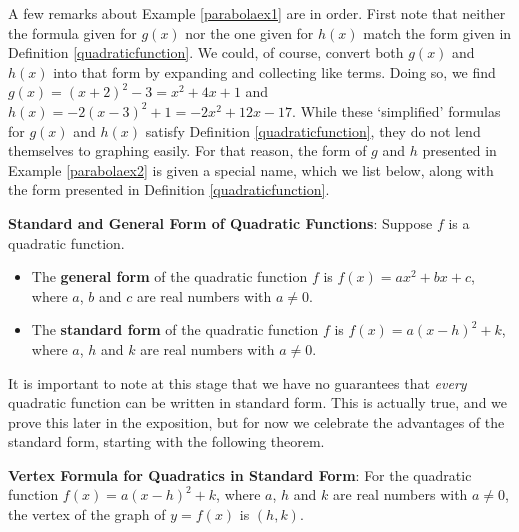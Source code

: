 A few remarks about Example \ref{parabolaex1} are in order.  First note that neither the formula given for $g(x)$ nor the one given for $h(x)$ match the form given in Definition \ref{quadraticfunction}. We could, of course, convert both $g(x)$ and $h(x)$ into that form by expanding and collecting like terms. Doing so, we find $g(x) = (x+2)^2 - 3 = x^2 + 4x+1$ and  $h(x) = -2(x-3)^2+1 = -2x^2+12x-17$.  While these `simplified' formulas for $g(x)$ and $h(x)$ satisfy  Definition \ref{quadraticfunction}, they do not lend themselves to graphing easily.  For that reason, the form of $g$ and $h$ presented in Example \ref{parabolaex2} is given a special name, which we list below, along with the form presented in  Definition \ref{quadraticfunction}.


\smallskip

\colorbox{ResultColor}{\bbm

\begin{defn} \label{standardgeneralformofparabolas} \textbf{Standard and General Form of Quadratic Functions}:  Suppose $f$ is a quadratic function. 

\begin{itemize}

\item The  \textbf{general form} of the quadratic function $f$ is $f(x) = ax^2+bx+c$, where $a$, $b$ and $c$ are real numbers with $a \neq 0$.

\item The  \textbf{standard form} of the quadratic function $f$ is $f(x) = a(x-h)^2 + k$, where $a$, $h$ and $k$ are real numbers with $a\neq 0$.

\end{itemize}

\end{defn}

\ebm}

\smallskip

It is important to note at this stage that we have no guarantees that \textit{every} quadratic function can be written in standard form.  This is actually true, and we prove this later in the exposition, but for now we celebrate the advantages of the standard form, starting with the following theorem.

\smallskip

\colorbox{ResultColor}{\bbm

\begin{thm}  \textbf{Vertex Formula for Quadratics in Standard Form}:  For the quadratic function $f(x) = a(x-h)^2 + k$, where $a$, $h$ and $k$ are real numbers with $a\neq 0$, the vertex of the graph of $y = f(x)$ is $(h,k)$.

\label{standardformvertex}

\end{thm}
\ebm}

